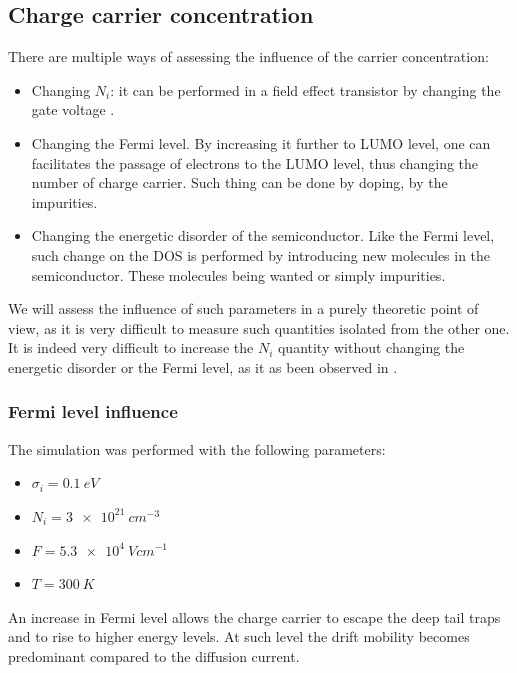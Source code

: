 \subsection{Charge carrier concentration}

There are multiple ways of assessing the influence of the carrier concentration:

\begin{itemize}
    \item Changing $N_i$: it can be performed in a field effect transistor by changing the gate voltage \cite{einstein_measurement}.
    \item Changing the Fermi level. By increasing it further to LUMO level, one can facilitates the passage of electrons to the LUMO level, thus changing the number of charge carrier. Such thing can be done by doping, by the impurities.
    \item Changing the energetic disorder of the semiconductor. Like the Fermi level, such change on the DOS is performed by introducing new molecules in the semiconductor. These molecules being wanted or simply impurities.
\end{itemize}

We will assess the influence of such parameters in a purely theoretic point of view, as it is very difficult to measure such quantities isolated from the other one. It is indeed very difficult to increase the $N_i$ quantity without changing the energetic disorder or the Fermi level, as it as been observed in \cite{einstein_measurement}.

\subsubsection{Fermi level influence}

The simulation was performed with the following parameters:

\begin{itemize}
    \item $\sigma_i = \SI{0.1}{eV}$
    \item $N_i = \SI{3e21}{cm^{-3}}$
    \item $F = \SI{5.3e4}{V cm^{-1}}$
    \item $T = \SI{300}{K}$
\end{itemize}

An increase in Fermi level allows the charge carrier to escape the deep tail traps and to rise to higher energy levels. At such level the drift mobility becomes predominant compared to the diffusion current.

